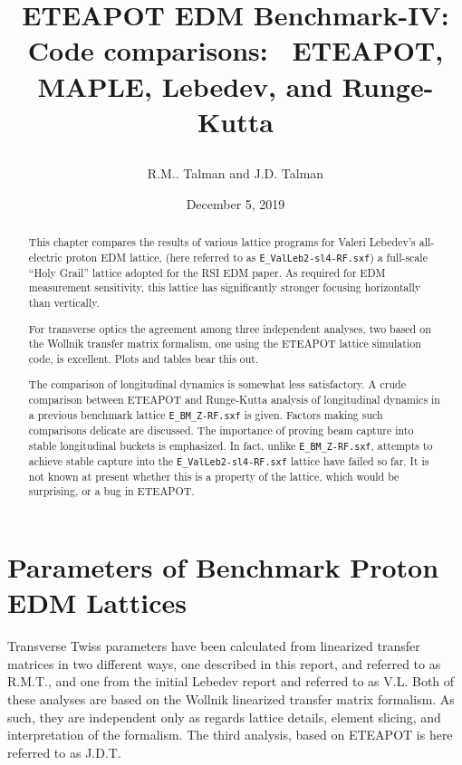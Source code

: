 \documentclass[12]{article}
\begin{document}
\date{December 5, 2019}

\title{
\centerline{}
\centerline{}
\centerline{}
ETEAPOT EDM Benchmark-IV: Code comparisons: \
ETEAPOT, MAPLE, Lebedev, and Runge-Kutta 
}
\author{R.M.. Talman and J.D. Talman
}

\maketitle


\begin{abstract}
This chapter compares the results of various lattice 
programs for Valeri Lebedev's all-electric proton EDM lattice, 
(here referred to as {\tt E\_ValLeb2-sl4-RF.sxf}) 
a full-scale ``Holy Grail'' lattice adopted for
the RSI EDM paper\cite{RSI-lattrice}. As required for EDM
measurement sensitivity, this lattice has significantly stronger 
focusing horizontally than vertically. 

For transverse optics the agreement among three independent 
analyses, two based on the Wollnik transfer matrix formalism, 
one using the ETEAPOT lattice simulation code, is excellent. 
Plots and tables bear this out.

The comparison of longitudinal dynamics is somewhat less
satisfactory. A crude comparison between ETEAPOT 
and Runge-Kutta analysis of longitudinal dynamics in a
previous benchmark lattice {\tt E\_BM\_Z-RF.sxf} is given. 
Factors making such comparisons delicate are discussed. 
The importance of proving beam capture into stable longitudinal 
buckets is emphasized. In fact, unlike {\tt E\_BM\_Z-RF.sxf},
attempts to achieve stable capture into the 
{\tt E\_ValLeb2-sl4-RF.sxf} lattice have failed so far.
It is not known at present whether this is a property of the
lattice, which would be surprising, or a bug in ETEAPOT.
\end{abstract}
%

\section{Parameters of Benchmark Proton EDM Lattices}
Transverse Twiss parameters have been calculated from linearized transfer matrices
in two different ways, one described in this report, and referred to as R.M.T., 
and one from the initial Lebedev report\cite{ValLeb2} and referred to as V.L. 
Both of these analyses are based on the Wollnik\cite{Wollnik} linearized transfer 
matrix formalism. As such, they are independent only as regards lattice details, 
element slicing, and interpretation of the formalism. The third analysis, based
on ETEAPOT is here referred to as J.D.T. 
\end{document}
